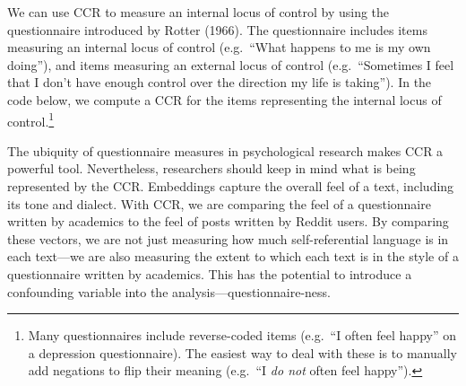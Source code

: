 \documentclass[
  man,
  floatsintext,
  longtable,
  nolmodern,
  notxfonts,
  notimes,
  colorlinks=true,linkcolor=blue,citecolor=blue,urlcolor=blue]{apa7}
\newenvironment{Shaded}{\begin{snugshade}}{\end{snugshade}}
\newcommand{\AttributeTok}[1]{\textcolor[rgb]{0.40,0.45,0.13}{#1}}
\newcommand{\CommentTok}[1]{\textcolor[rgb]{0.37,0.37,0.37}{#1}}
\newcommand{\ConstantTok}[1]{\textcolor[rgb]{0.56,0.35,0.01}{#1}}
\newcommand{\DecValTok}[1]{\textcolor[rgb]{0.68,0.00,0.00}{#1}}
\newcommand{\FunctionTok}[1]{\textcolor[rgb]{0.28,0.35,0.67}{#1}}
\newcommand{\NormalTok}[1]{\textcolor[rgb]{0.00,0.23,0.31}{#1}}
\newcommand{\OtherTok}[1]{\textcolor[rgb]{0.00,0.23,0.31}{#1}}
\newcommand{\SpecialCharTok}[1]{\textcolor[rgb]{0.37,0.37,0.37}{#1}}
\newcommand{\StringTok}[1]{\textcolor[rgb]{0.13,0.47,0.30}{#1}}
\begin{document}
We can use CCR to measure an internal locus of control by using the
questionnaire introduced by Rotter (1966). The questionnaire includes
items measuring an internal locus of control (e.g.~``What happens to me
is my own doing''), and items measuring an external locus of control
(e.g.~``Sometimes I feel that I don't have enough control over the
direction my life is taking''). In the code below, we compute a CCR for
the items representing the internal locus of control.\footnote{Many
  questionnaires include reverse-coded items (e.g.~``I often feel
  happy'' on a depression questionnaire). The easiest way to deal with
  these is to manually add negations to flip their meaning (e.g.~``I
  \emph{do not} often feel happy'').}

\begin{Shaded}
\end{Shaded}

The ubiquity of questionnaire measures in psychological research makes
CCR a powerful tool. Nevertheless, researchers should keep in mind what
is being represented by the CCR. Embeddings capture the overall feel of
a text, including its tone and dialect. With CCR, we are comparing the
feel of a questionnaire written by academics to the feel of posts
written by Reddit users. By comparing these vectors, we are not just
measuring how much self-referential language is in each text---we are
also measuring the extent to which each text is in the style of a
questionnaire written by academics. This has the potential to introduce
a confounding variable into the analysis---questionnaire-ness.
\end{document}
